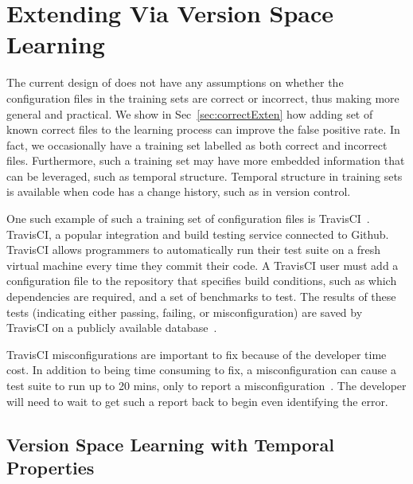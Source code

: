 
\section{Extending \app Via Version Space Learning}
\label{sec:travis}

The current design of \app does not have any assumptions on whether the
configuration files in the training sets are correct or 
incorrect, thus making \app more general and practical.
We show in Sec~\ref{sec:correctExten} how adding set of known correct files to 
the learning process can improve the false positive rate.
In fact, we occasionally have a training set labelled as both correct and incorrect files.
Furthermore, such a training set may have more embedded information that can be leveraged, such as temporal structure.
Temporal structure in training sets is available when code has a change history, such as in version control.

One such example of such a training set of configuration files is TravisCI~\cite{API}.
TravisCI, a popular integration and build testing service connected to Github.
TravisCI allows programmers to automatically run their test suite on a fresh virtual machine every time they commit their code.
A TravisCI user must add a configuration file to the repository that specifies build conditions, 
such as which dependencies are required, and a set of benchmarks to test. 
The results of these tests (indicating either passing, failing, or misconfiguration) 
are saved by TravisCI on a publicly available database~\cite{API}.

TravisCI misconfigurations are important to fix because of the developer time cost. 
In addition to being time consuming to fix, a misconfiguration can cause a test suite to run up to 20 mins, only to report a misconfiguration~\cite{API}.
The developer will need to wait to get such a report back to begin even identifying the error.


\subsection{Version Space Learning with Temporal Properties} 

